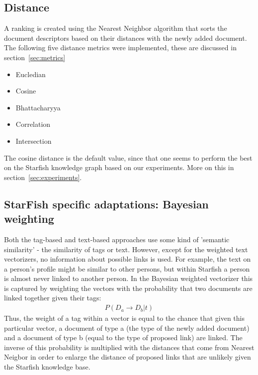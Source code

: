 \subsection{Distance}
A ranking is created using the Nearest Neighbor algorithm that sorts the
document descriptors based on their distances with the newly added document.
The following five distance metrics were implemented, these are discussed
in section~\ref{sec:metrics}

\begin{itemize}
\item Eucledian
\item Cosine
\item Bhattacharyya
\item Correlation
\item Intersection
\end{itemize}

The cosine distance is the default value, since that one seems to perform the
best on the Starfish knowledge graph based on our experiments. 
More on this in section~\ref{sec:experiments}. 

\subsection{StarFish specific adaptations: Bayesian weighting}
Both the tag-based and text-based approaches use some kind of 'semantic similarity' - the similarity of tags or text. However, except for the weighted text vectorizers, no information about possible links is used. For example, the text on a person's profile might be similar to other persons, but within Starfish a person is almost never linked to another person. In the Bayesian weighted vectorizer this is captured by weighting the vectors with the probability that two documents are linked together given their tags:
\begin{align}
\nonumber P(D_a \rightarrow D_b | t)
\end{align}
Thus, the weight of a tag within a vector is equal to the chance that given this particular vector, a document of type a (the type of the newly added document) and a document of type b (equal to the type of proposed link) are linked. The inverse of this probability is multiplied with the distances that come from Nearest Neigbor in order to enlarge the distance of proposed links that are unlikely given the Starfish knowledge base. 

